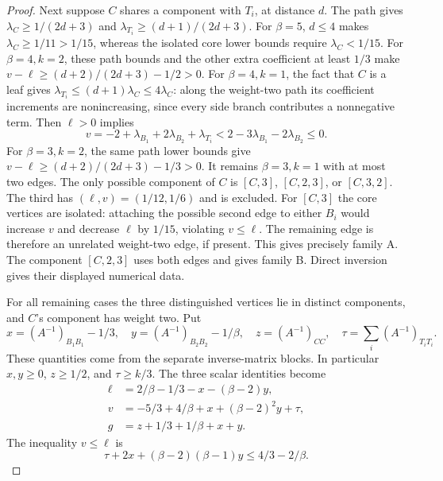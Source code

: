 \documentclass[11pt,reqno]{amsart}
\theoremstyle{definition}
\theoremstyle{remark}
\numberwithin{equation}{section}
\begin{document}
\begin{proof}
Next suppose $C$ shares a component with $T_i$, at distance $d$.
The path gives $\lambda_C\ge1/(2d+3)$ and
$\lambda_{T_i}\ge(d+1)/(2d+3)$.
For $\beta=5$, $d\le4$ makes $\lambda_C\ge1/11>1/15$, whereas the
isolated core lower bounds require $\lambda_C<1/15$.
For $\beta=4,k=2$, these path bounds and the other extra coefficient
at least $1/3$ make
$v-\ell\ge(d+2)/(2d+3)-1/2>0$.
For $\beta=4,k=1$, the fact that $C$ is a leaf gives
$\lambda_{T_i}\le(d+1)\lambda_C\le4\lambda_C$:
along the weight-two path its coefficient increments are nonincreasing,
since every side branch contributes a nonnegative term.
Then $\ell>0$ implies
\[
 v=-2+\lambda_{B_1}+2\lambda_{B_2}+\lambda_{T_i}
 <2-3\lambda_{B_1}-2\lambda_{B_2}\le0.
\]
For $\beta=3,k=2$, the same path lower bounds give
$v-\ell\ge(d+2)/(2d+3)-1/3>0$.
It remains $\beta=3,k=1$ with at most two edges.
The only possible component of $C$ is
$[C,3]$, $[C,2,3]$, or $[C,3,2]$.
The third has $(\ell,v)=(1/12,1/6)$ and is excluded.
For $[C,3]$ the core vertices are isolated: attaching the possible second
edge to either $B_i$ would increase $v$ and decrease $\ell$ by $1/15$,
violating $v\le\ell$.
The remaining edge is therefore an unrelated weight-two edge, if present.
This gives precisely family A. The component $[C,2,3]$ uses both edges
and gives family B. Direct inversion gives their displayed numerical data.

For all remaining cases the three distinguished vertices lie in distinct
components, and $C$'s component has weight two. Put
\[
 x=(A^{-1})_{B_1B_1}-1/3,\quad
 y=(A^{-1})_{B_2B_2}-1/\beta,\quad z=(A^{-1})_{CC},\quad
 \tau=\sum_i(A^{-1})_{T_iT_i}.
\]
These quantities come from the separate inverse-matrix blocks.
In particular $x,y\ge0$, $z\ge1/2$, and $\tau\ge k/3$.
The three scalar identities become
\begin{align}
 \ell&=2/\beta-1/3-x-(\beta-2)y,\label{eq:small-forest-block-length}\\
 v&=-5/3+4/\beta+x+(\beta-2)^2y+\tau,\label{eq:small-forest-block-square}\\
 g&=z+1/3+1/\beta+x+y.\label{eq:small-forest-block-energy}
\end{align}
The inequality $v\le\ell$ is
\begin{equation}\label{eq:small-forest-block-cap}
 \tau+2x+(\beta-2)(\beta-1)y\le4/3-2/\beta.
\end{equation}


\end{proof}
\end{document}
